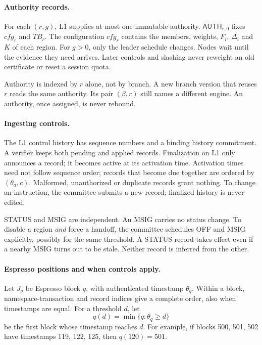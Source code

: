 \documentclass[11pt,a4paper]{article}
\newcommand{\TB}{\mathit{TB}}
\newcommand{\tagg}[1]{\ensuremath{\mathsf{#1}}}
\begin{document}
\paragraph{Authority records.}
For each $(r,g)$, L1 supplies at most one immutable authority.
$\tagg{AUTH}_{r,0}$ fixes $\mathit{cfg}_r$ and $\TB_r$. The configuration
$\mathit{cfg}_r$ contains the members, weights, $F_i$, $\Delta_i$ and $K$
of each region. For $g>0$, only the leader schedule changes. Nodes wait
until the evidence they need arrives. Later controls and slashing never
reweight an old certificate or reset a session quota.

Authority is indexed by $r$ alone, not by branch. A new branch version
that reuses $r$ reads the same authority. Its pair $(\beta,r)$ still
names a different engine. An authority, once assigned, is never
rebound.

\paragraph{Ingesting controls.}
The L1 control history has sequence numbers and a binding history
commitment. A verifier keeps both pending and applied records. Finalization on L1
only announces a record; it becomes active at its activation time. Activation times need not
follow sequence order; records that become due together are ordered by
$(\theta_a,c)$. Malformed, unauthorized or duplicate records grant
nothing. To change an instruction, the committee submits a new record;
finalized history is never edited.

STATUS and MSIG are independent. An MSIG carries no status change. To
disable a region \emph{and} force a handoff, the committee schedules
OFF and MSIG explicitly, possibly for the same threshold. A STATUS
record takes effect even if a nearby MSIG turns out to be stale.
Neither record is inferred from the other.

\paragraph{Espresso positions and when controls apply.}
Let $J_q$ be Espresso block $q$, with authenticated timestamp $\theta_q$.
Within a block, namespace-transaction and record indices give a complete
order, also when timestamps are equal. For a threshold $d$, let
\[
 q(d)=\min\{q:\theta_q\ge d\}
\]
be the first block whose timestamp reaches $d$. For example, if blocks
500, 501, 502 have timestamps 119, 122, 125, then $q(120)=501$.
\end{document}
